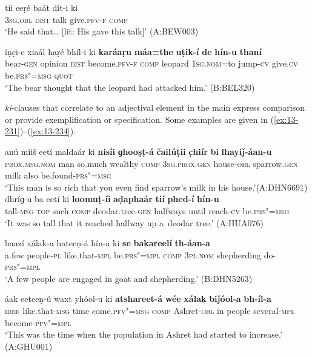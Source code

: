 \ex
\label{ex:13-229}
\gll tíi eeṛé baát dít-i ki  \\
\textsc{3sg.obl} \textsc{dist} talk give.\textsc{pfv-f} \textsc{comp}  \\
\glt `He said that{\ldots} [lit: His gave this talk]' (A:BEW003)

\ex
\label{ex:13-230}
\gll íṇc̣i-e xiaál haṛé bhíl-i  ki \textbf{karáaṛu} \textbf{máa=the} \textbf{uṭik-í} \textbf{de} \textbf{hín-u} \textbf{thaní} \\
bear-\textsc{gen} opinion \textsc{dist} become.\textsc{pfv-f} \textsc{comp} leopard \textsc{1sg.nom=}to jump-\textsc{cv} give.\textsc{cv} be.\textsc{prs"=msg} \textsc{quot} \\
\glt `The bear thought that the leopard had attacked him.' (B:BEL320) 
\z

 \textit{ki}-clauses that correlate to an adjectival element in the main  express comparison or provide exemplification or specification. Some examples are given in (\ref{ex:13-231})--(\ref{ex:13-234}).

\ea
\label{ex:13-231}
\gll anú míiš eetí maldaár ki \textbf{nisíi} \textbf{ɡhooṣṭ-á} \textbf{čailúṭii} \textbf{c̣hiír} \textbf{bi} \textbf{lhayiǰ-áan-u}\\
\textsc{prox.msg.nom} man so.much wealthy \textsc{comp} \textsc{3sg.prox.gen }  house-\textsc{obl} sparrow.\textsc{gen} milk also be.found-\textsc{prs"=msg}\\
\glt `This man is so rich that you even find sparrow's milk in his house.'\newline (A:DHN6691)
\ex
\label{ex:13-232}
\gll dhríɡ-u ba eetí ki \textbf{loomuṭ-íi} \textbf{aḍaphaár} \textbf{tií} \textbf{phed-í} \textbf{hín-u}\\
tall-\textsc{msg} \textsc{top} such \textsc{comp} deodar.tree-\textsc{gen} halfways until reach-\textsc{cv} be.\textsc{prs"=msg}\\
\glt `It was so tall that it reached halfway up a~deodar tree.' (A:HUA076)

\ex
\label{ex:13-233}
\gll baazí xálak-a hateeṇ-á hín-a ki \textbf{se} \textbf{bakareelí} \textbf{th-áan-a}\\
a.few people-\textsc{pl}  like.that-\textsc{mpl} be.\textsc{prs"=mpl} \textsc{comp}  \textsc{3pl.nom}  shepherding do-\textsc{prs"=mpl} \\
\glt `A few people are engaged in goat and shepherding.' (B:DHN5263)

\ex
\label{ex:13-234}
\gll áak eeteeṇ-ú waxt yhóol-u ki  \textbf{atshareet-á} \textbf{wée} \textbf{xálak} \textbf{biǰóol-a} \textbf{bh-íl-a} \\
\textsc{idef} like.that-\textsc{msg} time come.\textsc{pfv"=msg} \textsc{comp} Ashret-\textsc{obl} in people several-\textsc{mpl} become-\textsc{pfv"=mpl} \\
\glt `This was the time when the population in Ashret had started to increase.' (A:GHU001) 
\z

